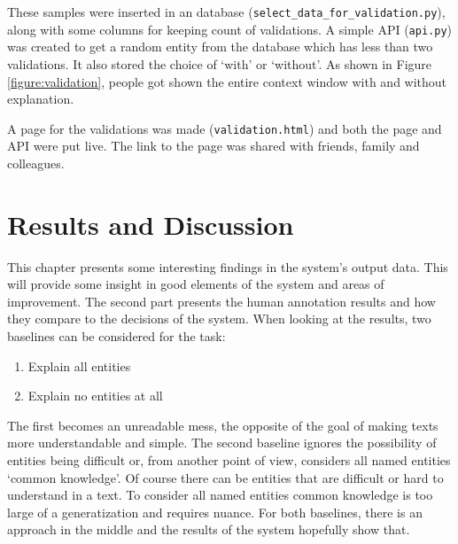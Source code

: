\documentclass[
10pt, %
a4paper, %
oneside, %
headinclude,footinclude, %
] {book}%
\begin{document}
These samples were inserted in an database (\verb+select_data_for_validation.py+), along with some columns for keeping count of validations.
A simple API (\verb+api.py+) was created to get a random entity from the database which has less than two validations.
It also stored the choice of `with' or `without'.
As shown in Figure \ref{figure:validation}, people got shown the entire context window with and without explanation.

A page for the validations was made (\verb+validation.html+) and both the page and API were put live.
The link to the page was shared with friends, family and colleagues.

\chapter{Results and Discussion}

This chapter presents some interesting findings in the system's output data.
This will provide some insight in good elements of the system and areas of improvement.
The second part presents the human annotation results and how they compare to the decisions of the system.
When looking at the results, two baselines can be considered for the task:
\begin{multicols}{2}
  \begin{enumerate}
    \item Explain all entities
    \item Explain no entities at all
  \end{enumerate}
\end{multicols}

The first becomes an unreadable mess, the opposite of the goal of making texts more understandable and simple.
The second baseline ignores the possibility of entities being difficult or, from another point of view, considers all named entities `common knowledge'.
Of course there can be entities that are difficult or hard to understand in a text.
To consider all named entities common knowledge is too large of a generatization and requires nuance.
For both baselines, there is an approach in the middle and the results of the system hopefully show that.
\end{document}
